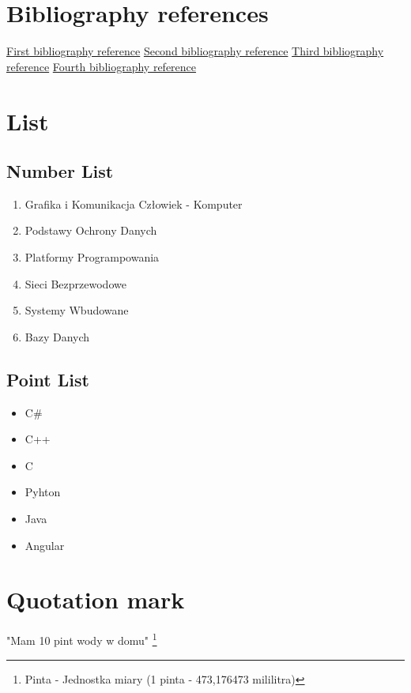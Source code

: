 \documentclass{article}
\begin{document}
\section{Bibliography references}
\hyperref[sec:bib1]{First bibliography reference}
\newline
\hyperref[sec:bib2]{Second bibliography reference}
\newline
\hyperref[sec:bib3]{Third bibliography reference}
\newline
\hyperref[sec:bib4]{Fourth bibliography reference}

\newpage
\section{List}
\subsection{Number List}

\begin{enumerate}
    \item Grafika i Komunikacja Człowiek - Komputer
    \item Podstawy Ochrony Danych
    \item Platformy Programpowania
    \item Sieci Bezprzewodowe
    \item Systemy Wbudowane
    \item Bazy Danych
\end{enumerate}

\subsection{Point List}

\begin{itemize}
    \item C\#
    \item C++
    \item C
    \item Pyhton
    \item Java
    \item Angular
\end{itemize}

\newpage
\section{Quotation mark}

"Mam 10 pint wody w domu"
\footnote{Pinta - Jednostka miary (1 pinta - 473,176473 mililitra)}
\newline
\end{document}
